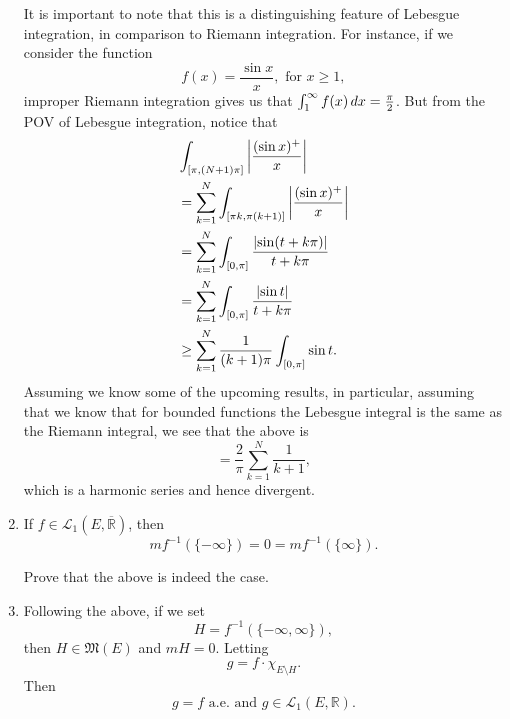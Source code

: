 \documentclass[notoc,notitlepage]{tufte-book}
\begin{document}
\begin{remark}
\begin{enumerate}
      It is important to note that this is a distinguishing feature of Lebesgue
      integration, in comparison to Riemann integration. For instance, if we
      consider the function
      \begin{equation*}
        f(x) = \frac{\sin x}{x}, \text{ for } x \geq 1,
      \end{equation*}
      improper Riemann integration gives us that $\int_{1}^{\infty} f(x) \mathop{}\!d{x}
      = \frac{\pi}{2}$. But from the POV of Lebesgue integration, notice that
      \begin{align*}
        &\int_{\left[\pi, (N+1)\pi\right]} \left|\frac{(\sin x)^+}{x}\right| \\
        &= \sum_{k=1}^{N} \int_{[\pi k, \pi(k+1)]} \left|\frac{(\sin x)^+}{x}\right| \\
        &= \sum_{k=1}^{N} \int_{[0, \pi]} \frac{\left|\sin(t + k\pi)\right|}{t + k\pi}
        \\
        &= \sum_{k=1}^{N} \int_{[0, \pi]} \frac{\left|\sin t\right|}{t + k\pi} \\
        &\geq \sum_{k=1}^{N} \frac{1}{(k+1)\pi} \int_{[0, \pi]} \sin t.
      \end{align*}
      Assuming we know some of the upcoming results, in particular, assuming
      that we know that for bounded functions the Lebesgue integral is the same
      as the Riemann integral, we see that the above is
      \begin{equation*}
        = \frac{2}{\pi} \sum_{k=1}^{N} \frac{1}{k+1},
      \end{equation*}
      which is a harmonic series and hence divergent.
    \item If $f \in \mathcal{L}_1(E, \overline{\mathbb{R}})$, then
      \begin{equation*}
        mf^{-1}(\{-\infty\}) = 0 = mf^{-1}(\{\infty\}).
      \end{equation*}
      \begin{ex}
        Prove that the above is indeed the case.
      \end{ex}
    \item Following the above, if we set
      \begin{equation*}
        H = f^{-1}(\{- \infty, \infty\}),
      \end{equation*}
      then $H \in \mathfrak{M}(E)$ and $mH = 0$. Letting
      \begin{equation*}
        g = f \cdot \chi_{E \setminus H}.
      \end{equation*}
      Then
      \begin{equation*}
        g = f \text{ a.e. and } g \in \mathcal{L}_1(E, \mathbb{R}).
      \end{equation*}


\end{enumerate}
\end{remark}
\end{document}
